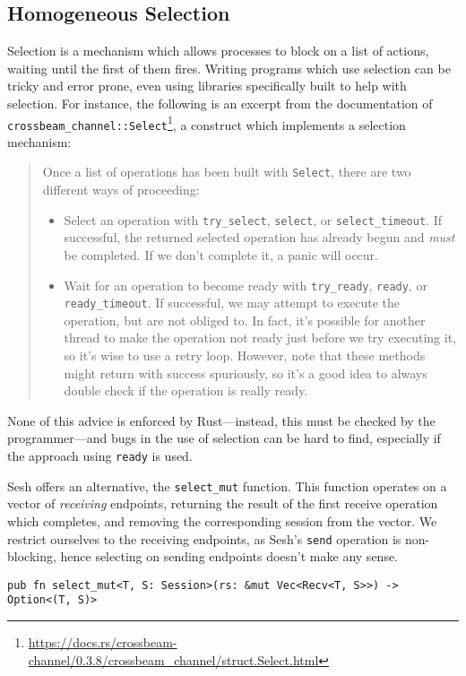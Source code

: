 \documentclass[copyright,creativecommons]{eptcs}
\begin{document}
\subsection{Homogeneous Selection}\label{sec:selection}
Selection is a mechanism which allows processes to block on a list of actions, waiting until the first of them fires. Writing programs which use selection can be tricky and error prone, even using libraries specifically built to help with selection. For instance, the following is an excerpt from the documentation of \lstinline{crossbeam_channel::Select}\footnote{\url{https://docs.rs/crossbeam-channel/0.3.8/crossbeam_channel/struct.Select.html}}, a construct which implements a selection mechanism:
\begin{quotation}
  \noindent
  Once a list of operations has been built with \lstinline{Select}, there are two different ways of proceeding:
  \begin{itemize}
  \item Select an operation with \lstinline{try_select}, \lstinline{select}, or \lstinline{select_timeout}. If successful, the returned selected operation has already begun and \emph{must} be completed. If we don't complete it, a panic will occur.
  \item Wait for an operation to become ready with \lstinline{try_ready}, \lstinline{ready}, or \lstinline{ready_timeout}. If successful, we may attempt to execute the operation, but are not obliged to. In fact, it's possible for another thread to make the operation not ready just before we try executing it, so it's wise to use a retry loop. However, note that these methods might return with success spuriously, so it's a good idea to always double check if the operation is really ready.
  \end{itemize}
\end{quotation}
None of this advice is enforced by Rust---instead, this must be checked by the programmer---and bugs in the use of selection can be hard to find, especially if the approach using \lstinline{ready} is used.

Sesh offers an alternative, the \lstinline{select_mut} function. This function operates on a vector of \emph{receiving} endpoints, returning the result of the first receive operation which completes, and removing the corresponding session from the vector. We restrict ourselves to the receiving endpoints, as Sesh's \lstinline{send} operation is non-blocking, hence selecting on sending endpoints doesn't make any sense.
\begin{lstlisting}
pub fn select_mut<T, S: Session>(rs: &mut Vec<Recv<T, S>>) -> Option<(T, S)>
\end{lstlisting}
\end{document}
